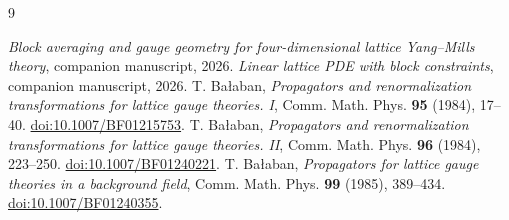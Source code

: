 \documentclass[11pt,letterpaper,reqno]{amsart}
\numberwithin{equation}{section}
\theoremstyle{definition}
\theoremstyle{remark}
\begin{document}
\clearpage
\begin{thebibliography}{9}
\raggedright
{} \emph{Block averaging and gauge geometry for four-dimensional lattice Yang--Mills theory}, companion manuscript, 2026.
 \emph{Linear lattice PDE with block constraints}, companion manuscript, 2026.
 T. Ba\l aban, \emph{Propagators and renormalization transformations for lattice gauge theories. I}, Comm. Math. Phys. \textbf{95} (1984), 17--40. \href{https://doi.org/10.1007/BF01215753}{doi:10.1007/BF01215753}.
 T. Ba\l aban, \emph{Propagators and renormalization transformations for lattice gauge theories. II}, Comm. Math. Phys. \textbf{96} (1984), 223--250. \href{https://doi.org/10.1007/BF01240221}{doi:10.1007/BF01240221}.
 T. Ba\l aban, \emph{Propagators for lattice gauge theories in a background field}, Comm. Math. Phys. \textbf{99} (1985), 389--434. \href{https://doi.org/10.1007/BF01240355}{doi:10.1007/BF01240355}.
\end{thebibliography}
\end{document}

